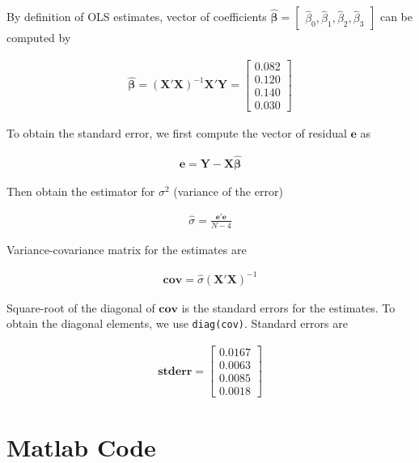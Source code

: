 \documentclass[11pt,letter]{article}
\newcommand{\vect}[1]{\boldsymbol{\mathbf{#1}}}
\newcounter{lem}[section] \setcounter{lem}{0}
\newcommand{\prn}[1]{\left({#1}\right)}
\newcommand{\bmat}[1]{\begin{bmatrix} #1 \end{bmatrix}}%
\newcommand{\code}[1]{\texttt{#1}}
\begin{document}
By definition of OLS estimates, vector of coefficients $\hat{\vect{\beta}}=\bmat{\hat{\beta}_0,\hat{\beta}_1,\hat{\beta}_2,\hat{\beta}_3}$ can be computed by

\begin{align*}
\hat{\vect{\beta}} =\prn{\vect{X}'\vect{X}}^{-1}\vect{X}'\vect{Y} = \left[\begin{array}{r} 0.082\\ 0.120\\ 0.140\\ 0.030 \end{array}\right]
\end{align*}

To obtain the standard error, we first compute the vector of residual $\vect{e}$ as

\begin{align*}
\vect{e} = \vect{Y} - \vect{X}\hat{\vect{\beta}} 
\end{align*}

Then obtain the estimator for $\sigma^2$ (variance of the error)

\begin{align*}
\hat{\sigma} = \frac{\vect{e}'\vect{e}}{N-4}
\end{align*}

Variance-covariance matrix for the estimates are 


\begin{align*}
\vect{cov} = \hat{\sigma} (\vect{X}'\vect{X})^{-1}
\end{align*}

Square-root of the diagonal of $\vect{cov}$ is the standard errors for the estimates. To obtain the diagonal elements, we use \code{diag(cov)}. Standard errors are

\begin{align*}
\vect{stderr} = \left[\begin{array}{c} 0.0167\\ 0.0063\\ 0.0085\\ 0.0018 \end{array}\right]
\end{align*}


\section*{Matlab Code}

\end{document}
